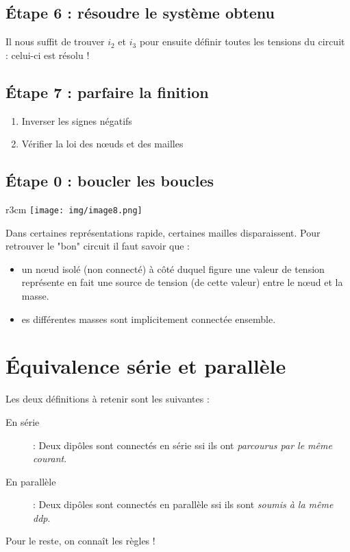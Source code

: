 \documentclass	[11pt, a4paper, openany]{book}
\begin{document}
\subsection{Étape 6 : résoudre le système obtenu}
Il nous suffit de trouver $i_2$ et $i_3$ pour ensuite définir toutes les tensions du circuit : celui-ci est résolu !

\subsection{Étape 7 : parfaire la finition}
\begin{enumerate}
\item Inverser les signes négatifs
\item Vérifier la loi des nœuds et des mailles
\end{enumerate}

\subsection{Étape 0 : boucler les boucles}
\begin{wrapfigure}[4]{r}{3cm}
\texttt{[image: img/image8.png]}
\end{wrapfigure}
Dans certaines représentations rapide, certaines mailles disparaissent. Pour retrouver le "bon" circuit il faut savoir que :
\begin{itemize}
\item un nœud isolé (non connecté) à côté duquel figure une valeur de tension représente en fait une source de tension (de cette valeur) entre le nœud et la masse. 
\item es différentes masses sont implicitement connectée ensemble.
\end{itemize}

\setcounter{section}{4}
\section{Équivalence série et parallèle}
Les deux définitions à retenir sont les suivantes :
\begin{description}
\item[En série] : Deux dipôles sont connectés en série ssi ils ont \textit{parcourus par le même courant}.
\item[En parallèle] : Deux dipôles sont connectés en parallèle ssi ils sont \textit{soumis à la même ddp}.
\end{description}
Pour le reste, on connaît les règles !
\end{document}
